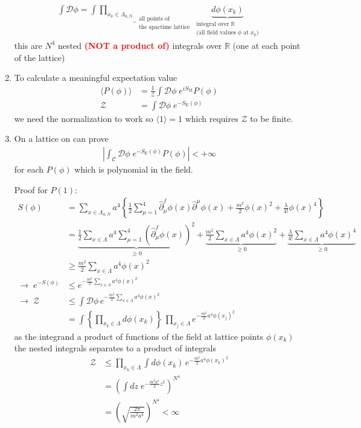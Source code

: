 \documentclass[10pt,a4paper]{article}
\theoremstyle{definition}
\begin{document}
\begin{enumerate}[(1)]
\begin{align}
\int\mathcal{D}\phi=\int\underbrace{\prod_{x_k\in \Lambda_{a,N}}}_{
\begin{array}{c}
\scriptstyle \text{all points of} \\
\scriptstyle \text{the spactime lattice}
\end{array}
}\underbrace{ d\phi(x_k)}_{
\begin{array}{c}
\scriptstyle \text{integral over $\mathbb{R}$ } \\
\scriptstyle \text{(all field values $\phi$ at $x_k$)}
\end{array}
}
\end{align}
this are $N^4$ nested \textcolor{red}{\bf (NOT a product of) } integrals over $\mathbb{R}$ (one at each point of the lattice)
\item To calculate a meaningful expectation value
\begin{align}
\langle P(\phi)\rangle &=\frac{1}{\mathcal{Z}}\int \mathcal{D}\phi\; e^{iS_\text{M}}P(\phi)\\
\mathcal{Z}&=\int \mathcal{D}\phi\; e^{-S_\text{E}(\phi)}
\end{align}
we need the normalization to work so $\langle1\rangle=1$ which requires $\mathcal{Z}$ to be finite.

\item On a lattice on can prove
\begin{align}
\left|\int_\mathcal{C} \mathcal{D}\phi\; e^{-S_\text{E}(\phi)}P(\phi)\right|<+\infty
\end{align}
for each $P(\phi)$ which is polynomial in the field.

Proof for $P(1)$:
\begin{align}
S(\phi)&=\sum_{x\in\Lambda_{a,N}}a^4\left\{\frac{1}{2}\sum_{\mu=1}^4\hat\partial^f_\mu\phi(x)\hat\partial^\mu\phi(x)+\frac{m^2}{2}\phi(x)^2+\frac{\lambda}{4!}\phi(x)^4\right\}\\
&=\underbrace{\frac{1}{2}\sum_{x\in\Lambda}a^4\sum_{\mu=1}^4\left(\hat\partial^f_\mu\phi(x)\right)^2}_{\ge0}+
\underbrace{\frac{m^2}{2}\sum_{x\in\Lambda}a^4\phi(x)^2}_{\ge0}+
\underbrace{\frac{\lambda}{4!}\sum_{x\in\Lambda}a^4\phi(x)^4}_{\ge0}\\
&\ge \frac{m^2}{2}\sum_{x\in\Lambda}a^4\phi(x)^2\\
\rightarrow\; e^{-S(\phi)}&\le e^{-\frac{m^2}{2}\sum_{x\in\Lambda}a^4\phi(x)^2}\\
\rightarrow\; \mathcal{Z}&\le\int\mathcal{D}\phi\, e^{-\frac{m^2}{2}\sum_{x\in\Lambda}a^4\phi(x)^2}\\
&=\int\left\{\prod_{x_k\in\Lambda} d\phi(x_k)\right\}\, \prod_{x_j\in\Lambda} e^{-\frac{m^2}{2}a^4\phi(x_j)^2}
\end{align}
as the integrand a product of functions of the field at lattice points $\phi(x_k)$ the nested integrals separates to a product of integrals
\begin{align}
\mathcal{Z}&\le\prod_{x_k\in\Lambda}\int d\phi(x_k)\,e^{-\frac{m^2}{2}a^4\phi(x_k)^2}\\
&=\left(\int dz\;e^{-\frac{m^2a^4}{2}z^2}\right)^{N^4}\\
&=\left(\sqrt{\frac{2\pi}{m^2a^4}}\right)^{N^4}<\infty
\end{align}
\end{enumerate}
\end{document}
